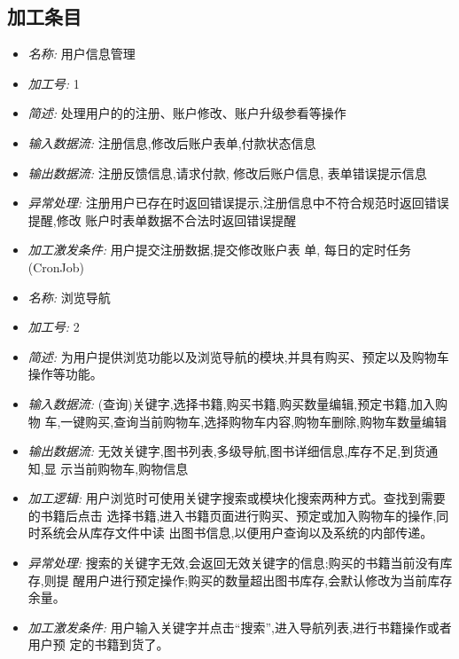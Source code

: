 \documentclass{article}
\begin{document}
\begin{CJK*}{UTF8}{gbsn}
\begin{itemize}
\end{itemize}


\vspace{-1mm}

\subsection{加工条目}
\begin{itemize}
\item \textit{名称: }用户信息管理
\item \textit{加工号: }1
\item \textit{简述: }处理用户的的注册、账户修改、账户升级参看等操作
\item \textit{输入数据流: } 注册信息,修改后账户表单,付款状态信息
\item \textit{输出数据流: } 注册反馈信息,请求付款, 修改后账户信息, 表单错误提示信息 
\item \textit{异常处理: } 注册用户已存在时返回错误提示,注册信息中不符合规范时返回错误提醒,修改 账户时表单数据不合法时返回错误提醒 
\item \textit{加工激发条件: }用户提交注册数据,提交修改账户表 单, 每日的定时任务(CronJob)

\end{itemize}


\vspace{-1mm}


\begin{itemize}
\item \textit{名称: }浏览导航
\item \textit{加工号: }2 
\item \textit{简述: }为用户提供浏览功能以及浏览导航的模块,并具有购买、预定以及购物车操作等功能。 
\item \textit{输入数据流: }(查询)关键字,选择书籍,购买书籍,购买数量编辑,预定书籍,加入购物 车,一键购买,查询当前购物车,选择购物车内容,购物车删除,购物车数量编辑 
\item \textit{输出数据流: }无效关键字,图书列表,多级导航,图书详细信息,库存不足,到货通知,显 示当前购物车,购物信息
\item \textit{加工逻辑: }用户浏览时可使用关键字搜索或模块化搜索两种方式。查找到需要的书籍后点击 选择书籍,进入书籍页面进行购买、预定或加入购物车的操作,同时系统会从库存文件中读 出图书信息,以便用户查询以及系统的内部传递。 
\item \textit{异常处理: }搜索的关键字无效,会返回无效关键字的信息;购买的书籍当前没有库存,则提 醒用户进行预定操作;购买的数量超出图书库存,会默认修改为当前库存余量。 
\item \textit{加工激发条件: }用户输入关键字并点击“搜索”,进入导航列表,进行书籍操作或者用户预 定的书籍到货了。


\end{itemize}
\end{CJK*}
\end{document}
